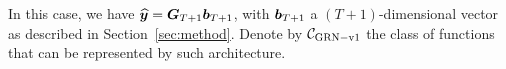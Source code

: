 


 In this case, we have $\widehat{\bm{y}} = {\bm{G}}_{T+1}\bm{b}_{T+1}$, with $\bm{b}_{T+1}$ a $(T+1)$-dimensional vector as described in Section~\ref{sec:method}. Denote by $\mathcal{C}_{\rm GRN-v1{}}$  the class of functions that can be represented by such architecture.
%
%

